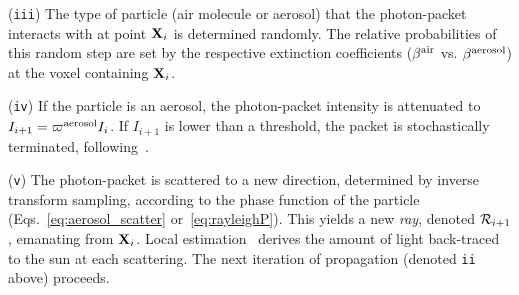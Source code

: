 \documentclass[10pt,letterpaper]{article}
\begin{document}
\noindent ({\tt iii}) The type of particle (air molecule or aerosol)
that the photon-packet interacts with at point ${\bf X}_{i}$ is determined
randomly. The relative probabilities of this random step are set by the respective extinction coefficients
($\beta^{\rm air}$ vs. $\beta^{\rm aerosol}$) at the voxel containing ${\bf X}_{i}$.


\noindent ({\tt iv}) If the particle is an aerosol, the photon-packet intensity
is attenuated to $I_{i+1}=\varpi^{\rm aerosol}I_{i}$. If $I_{i+1}$ is
lower than a threshold, the packet is stochastically terminated,
following~\cite{Iwabuchi2006}.

\noindent ({\tt v}) The photon-packet is scattered to a new direction,
determined by inverse transform sampling, according to the phase
function of the particle (Eqs.~\ref{eq:aerosol_scatter}
or~\ref{eq:rayleighP}). This yields a new {\em ray}, denoted ${\cal
  R}_{i+1}$, emanating from ${\bf X}_{i}$. Local
estimation~\cite{marshak20053d} derives the amount of
light back-traced to the sun at each scattering. The next iteration of
propagation (denoted {\tt ii} above) proceeds.
\end{document}
